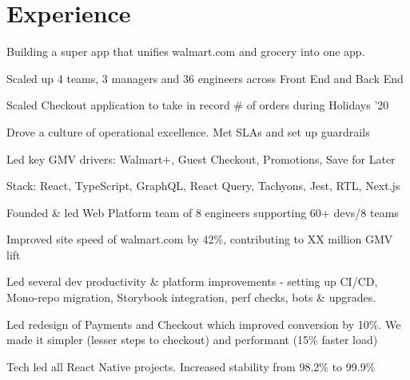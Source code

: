 \documentclass[]{my-resume-openfont}
\begin{document}
\hfill
\begin{minipage}[t]{0.66\textwidth}


\section{Experience}


\vspace{\topsep} %
\begin{tightemize}
\item Building a super app that unifies walmart.com and grocery into one app.
\item Scaled up 4 teams, 3 managers and 36 engineers across Front End and Back End
\item Scaled Checkout application to take in record \# of orders during Holidays '20
\item Drove a culture of operational excellence. Met SLAs and set up guardrails
\item Led key GMV drivers: Walmart+, Guest Checkout, Promotions, Save for Later
\item Stack: React, TypeScript, GraphQL, React Query, Tachyons, Jest, RTL, Next.js
\vspace{1mm} %
\end{tightemize}

\begin{tightemize}
\item Founded \& led Web Platform team of 8 engineers supporting 60+ devs/8 teams
\item Improved site speed of walmart.com by 42\%, contributing to XX million GMV lift
\item Led several dev productivity \& platform improvements - setting up CI/CD, Mono-repo migration, Storybook integration, perf checks, bots \& upgrades.

\vspace{1mm} %
\end{tightemize}

\begin{tightemize}
\item Led redesign of Payments and Checkout which improved conversion by 10\%. We made it simpler (lesser steps to checkout) and performant (15\% faster load)
\item Tech led all React Native projects. Increased stability from 98.2\% to 99.9\%
\vspace{1mm} %
\end{tightemize}


\end{minipage}
\end{document}

